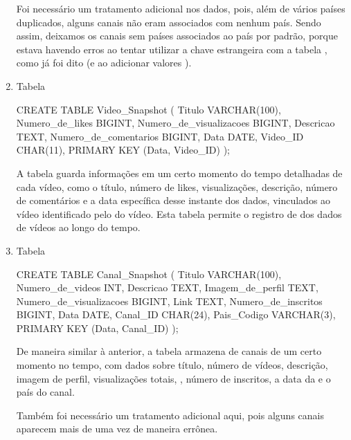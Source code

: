 \begin{enumerate}
    Foi necessário um tratamento adicional nos dados, pois, além de vários países duplicados, alguns canais não eram associados com nenhum país. Sendo assim, deixamos os canais sem países associados ao país  por padrão, porque estava havendo erros ao tentar utilizar a chave estrangeira com a tabela , como já foi dito (e ao adicionar valores ).

    \item Tabela 

    \begin{code}
      CREATE TABLE Video_Snapshot (
        Titulo VARCHAR(100),
        Numero_de_likes BIGINT,
        Numero_de_visualizacoes BIGINT,
        Descricao TEXT,
        Numero_de_comentarios BIGINT,
        Data DATE,
        Video_ID CHAR(11),
        PRIMARY KEY (Data, Video_ID)
      );
    \end{code}

    A tabela  guarda informações em um certo momento do tempo detalhadas de cada vídeo, como o título, número de likes, visualizações, descrição, número de comentários e a data específica desse instante dos dados, vinculados ao vídeo identificado pelo  do vídeo. Esta tabela permite o registro de  dos dados de vídeos ao longo do tempo.

    \item Tabela 

    \begin{code}
      CREATE TABLE Canal_Snapshot (
        Titulo VARCHAR(100),
        Numero_de_videos INT,
        Descricao TEXT,
        Imagem_de_perfil TEXT,
        Numero_de_visualizacoes BIGINT,
        Link TEXT,
        Numero_de_inscritos BIGINT,
        Data DATE,
        Canal_ID CHAR(24),
        Pais_Codigo VARCHAR(3),
        PRIMARY KEY (Data, Canal_ID)
      );
    \end{code}

    De maneira similar à anterior, a tabela  armazena  de canais de um certo momento no tempo, com dados sobre título, número de vídeos, descrição, imagem de perfil, visualizações totais, , número de inscritos, a data da  e o país do canal.

    Também foi necessário um tratamento adicional aqui, pois alguns canais aparecem mais de uma vez de maneira errônea.


\end{enumerate}
